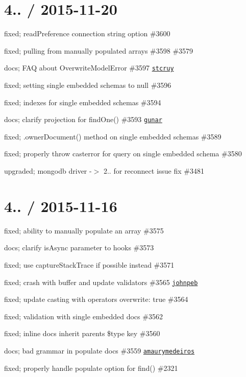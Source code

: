 \section*{4.. / 2015-\/11-\/20 }


\begin{DoxyItemize}
\item fixed; read\+Preference connection string option \#3600
\item fixed; pulling from manually populated arrays \#3598 \#3579
\item docs; F\+AQ about Overwrite\+Model\+Error \#3597 \href{https://github.com/stcruy}{\tt stcruy}
\item fixed; setting single embedded schemas to null \#3596
\item fixed; indexes for single embedded schemas \#3594
\item docs; clarify projection for {\ttfamily find\+One()} \#3593 \href{https://github.com/gunar}{\tt gunar}
\item fixed; .owner\+Document() method on single embedded schemas \#3589
\item fixed; properly throw casterror for query on single embedded schema \#3580
\item upgraded; mongodb driver -\/$>$ 2.. for reconnect issue fix \#3481
\end{DoxyItemize}

\section*{4.. / 2015-\/11-\/16 }


\begin{DoxyItemize}
\item fixed; ability to manually populate an array \#3575
\item docs; clarify {\ttfamily is\+Async} parameter to hooks \#3573
\item fixed; use capture\+Stack\+Trace if possible instead \#3571
\item fixed; crash with buffer and update validators \#3565 \href{https://github.com/johnpeb}{\tt johnpeb}
\item fixed; update casting with operators overwrite\+: true \#3564
\item fixed; validation with single embedded docs \#3562
\item fixed; inline docs inherit parents \$type key \#3560
\item docs; bad grammar in populate docs \#3559 \href{https://github.com/amaurymedeiros}{\tt amaurymedeiros}
\item fixed; properly handle populate option for find() \#2321
\end{DoxyItemize}

